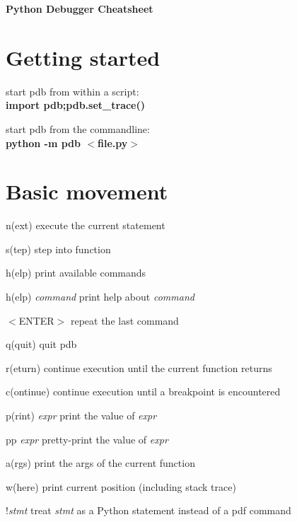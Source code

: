 \documentclass[11pt,landscape,a4paper]{article}
\newcommand{\keystroke}[1]{$<$#1$>$}
\begin{document}
  \begin{center}
    \huge \bfseries Python Debugger Cheatsheet\\
    \vspace{1cm}
  \end{center}

  \begin{multicols}{2}
    \section{Getting started}
      start pdb from within a script:\\
      {\bfseries import pdb;pdb.set\_trace()}
      
      start pdb from the commandline:\\
      {\bfseries python -m pdb \keystroke{file.py}}
      
    \section{Basic movement}
      \begin{eqlist}
        \item[n(ext)] execute the current statement
        \item[s(tep)] step into function
        \item[h(elp)] print available commands
        \item[h(elp) \textit{command}] print help about \textit{command}
        \item[\keystroke{ENTER}] repeat the last command
        \item[q(quit)] quit pdb

        \item[r(eturn)] continue execution until the current function returns
        \item[c(ontinue)] continue execution until a breakpoint is encountered

        \item[p(rint) \textit{expr}] print the value of \textit{expr}
        \item[pp \textit{expr}] pretty-print the value of \textit{expr}
        \item[a(rgs)] print the args of the current function
        \item[w(here)] print current position (including stack trace)
        
        \item[!\textit{stmt}] treat \textit{stmt} as a Python statement instead of a pdf command


\end{eqlist}
\end{multicols}
\end{document}

